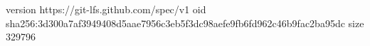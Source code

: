version https://git-lfs.github.com/spec/v1
oid sha256:3d300a7af3949408d5aae7956c3eb5f3dc98aefe9fb6fd962c46b9fac2ba95dc
size 329796
